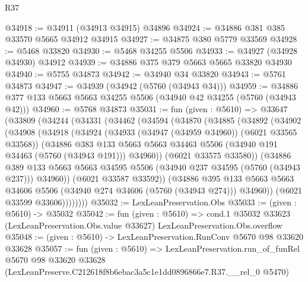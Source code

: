 \begin{lexlean}{R37}
\begin{coremodule}
@34918 := @34911 (@34913 @34915) @34896
@34924 := @34886 @381 @385 @33570 @5665 @34912 @34915
@34927 := @34875 @380 @5779 @33569
@34928 := @5468 @33820
@34930 := @5468 @34255 @5506
@34933 := @34927 (@34928 @34930) @34912
@34939 := @34886 @375 @379 @5663 @5665 @33820 @34930
@34940 := @5755 @34873
@34942 := @34940 @34 @33820
@34943 := @5761 @34873
@34947 := @34939 (@34942 (@5760 (@34943 @34)))
@34959 := @34886 @377 @133 @5663 @5663 @34255 @5506 (@34940 @42 @34255 (@5760 (@34943 @42)))
@34960 := @5768 @34873
@35031 := fun (given : @5610) =>
  @33647
    (@33809
      (@34244
        (@34331
          (@34462
            (@34594
              (@34870
                (@34885
                  (@34892
                    (@34902
                      (@34908
                        (@34918
                          (@34924
                            (@34933 (@34947 (@34959 @34960)) (@6021 @33565 @33568))
                            (@34886
                              @383
                              @133
                              @5663
                              @5663
                              @34463
                              @5506
                              (@34940 @191 @34463 (@5760 (@34943 @191)))
                              @34960))
                          (@6021 @33575 @33580))
                        (@34886
                          @389
                          @133
                          @5663
                          @5663
                          @34595
                          @5506
                          (@34940 @237 @34595 (@5760 (@34943 @237)))
                          @34960))
                      (@6021 @33587 @33592))
                    (@34886
                      @395
                      @133
                      @5663
                      @5663
                      @34606
                      @5506
                      (@34940 @274 @34606 (@5760 (@34943 @274)))
                      @34960))
                  (@6021 @33599 @33606))))))))
@35032 := LexLeanPreservation.Obs
@35033 := (given : @5610) -> @35032
@35042 := fun (given : @5610) =>
  cond.{1} @35032 @33623 (LexLeanPreservation.Obs.value @33627) LexLeanPreservation.Obs.overflow
@35048 := (given : @5610) -> LexLeanPreservation.RunConv @5670 @98 @33620 @33628
@35057 := fun (given : @5610) =>
  LexLeanPreservation.run_of_funRel
    @5670
    @98
    @33620
    @33628
    (LexLeanPreserve.C212618f8b6ebac3a5c1e1dd0896866e7.R37.__rel_0 @5470)
\end{coremodule}
\end{lexlean}
